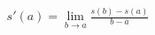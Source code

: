 \documentclass[preview]{standalone}
\begin{document}
\begin{align*}
s'(a) = \lim_{b \to a} \frac{s(b) - s(a)}{b-a}
\end{align*}
\end{document}
